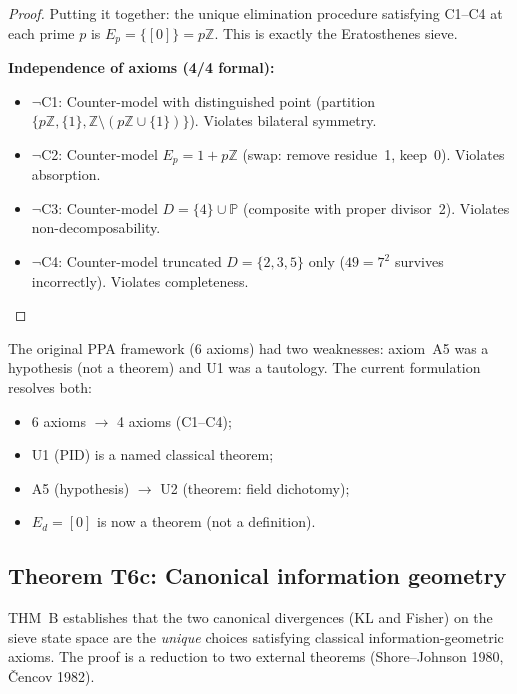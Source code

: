 \documentclass[12pt,a4paper]{article}
\begin{document}
\begin{theorem}
\begin{proof}
\medskip
Putting it together: the unique elimination procedure satisfying C1--C4 at
each prime $p$ is $E_p = \{[0]\} = p\mathbb{Z}$. This is exactly the
Eratosthenes sieve.

\textbf{Independence of axioms (4/4 formal):}
\begin{itemize}
\item $\neg$C1: Counter-model with distinguished point (partition
  $\{p\mathbb{Z}, \{1\}, \mathbb{Z}\setminus(p\mathbb{Z}\cup\{1\})\}$).
  Violates bilateral symmetry.
\item $\neg$C2: Counter-model $E_p = 1 + p\mathbb{Z}$ (swap: remove residue~1,
  keep~0). Violates absorption.
\item $\neg$C3: Counter-model $D = \{4\} \cup \mathbb{P}$ (composite with
  proper divisor~2). Violates non-decomposability.
\item $\neg$C4: Counter-model truncated $D = \{2,3,5\}$ only
  ($49 = 7^2$ survives incorrectly). Violates completeness.
\end{itemize}
\end{proof}
\end{theorem}

\begin{remark}
The original PPA framework (6 axioms) had two weaknesses:
axiom~A5 was a hypothesis (not a theorem) and U1 was a tautology. The current formulation resolves both:
\begin{itemize}
\item 6 axioms $\to$ 4 axioms (C1--C4);
\item U1 (PID) is a named classical theorem;
\item A5 (hypothesis) $\to$ U2 (theorem: field dichotomy);
\item $E_d = [0]$ is now a theorem (not a definition).
\end{itemize}
\end{remark}

\subsection{Theorem T6c: Canonical information geometry}
\label{sec:T6_geometry}

THM~B establishes that the two canonical divergences (KL and Fisher)
on the sieve state space are the \emph{unique} choices satisfying
classical information-geometric axioms. The proof is a reduction to
two external theorems (Shore--Johnson 1980, \v Cencov 1982).
\end{document}
